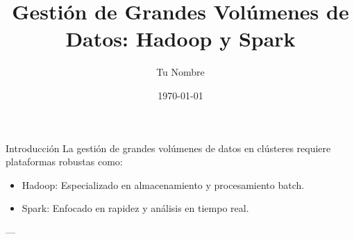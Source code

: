 \documentclass[presentation]{beamer}
\author{Tu Nombre}
\date{\today{}}
\title{Gestión de Grandes Volúmenes de Datos: Hadoop y Spark}
\begin{document}
\maketitle

\begin{frame}[label={sec:org69217f2}]{Introducción}
La gestión de grandes volúmenes de datos en clústeres requiere plataformas robustas como:
\begin{itemize}
\item \alert{\alert{Hadoop}}: Especializado en almacenamiento y procesamiento batch.
\item \alert{\alert{Spark}}: Enfocado en rapidez y análisis en tiempo real.
\end{itemize}

---
\end{frame}
\end{document}
